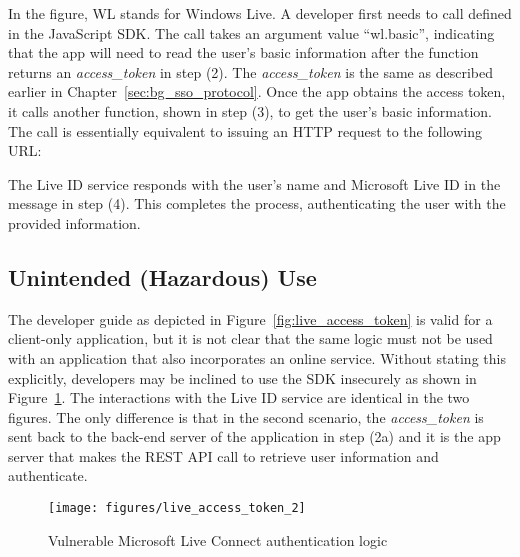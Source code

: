 In the figure, WL stands for Windows Live. A developer first needs to call  defined in the JavaScript SDK. The call takes an argument value ``wl.basic'', indicating that the app will need to read the user's basic information after the function returns an \emph{access\_token} in step (2).  The \emph{access\_token} is the same as described earlier in Chapter~\ref{sec:bg_sso_protocol}.  Once the app obtains the access token, it calls another function, shown in step (3), to get the user's basic information.  The call is essentially equivalent to issuing an HTTP request to the following URL:

\setlength{\fboxrule}{0pt}

The Live ID service responds with the user's name and Microsoft Live ID in the message in step (4). This completes the process, authenticating the user with the provided information. 

\subsection{Unintended (Hazardous) Use}

The developer guide as depicted in Figure~\ref{fig:live_access_token} is valid for a client-only application, but it is not clear that the same logic must not be used with an application that also incorporates an online service.  Without stating this explicitly, developers may be inclined to use the SDK insecurely as shown in Figure~\ref{fig:live_access_token_2}. The interactions with the Live ID service are identical in the two figures.  The only difference is that in the second scenario, the \emph{access\_token} is sent back to the back-end server of the application in step (2a) and it is the app server that makes the REST API call to retrieve user information and authenticate. 

\begin{figure}[hbt]
\centering
\texttt{[image: figures/live\_access\_token\_2]}
\caption{Vulnerable Microsoft Live Connect authentication logic}
\label{fig:live_access_token_2}
\end{figure}

